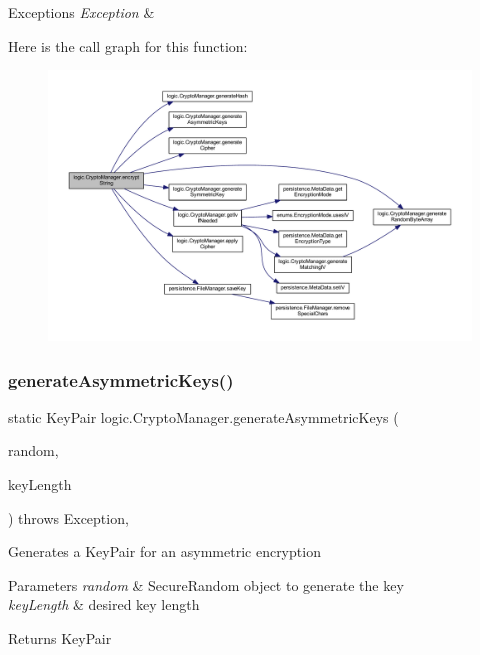 \begin{DoxyExceptions}{Exceptions}
{\em Exception} & \\
\hline
\end{DoxyExceptions}
Here is the call graph for this function\+:\nopagebreak
\begin{figure}[H]
\begin{center}
\leavevmode
\includegraphics[width=350pt]{classlogic_1_1_crypto_manager_a36145e4757e6a380388baddf5e36e984_cgraph}
\end{center}
\end{figure}
\mbox{\label{classlogic_1_1_crypto_manager_a769894ae14be3ae193f48941fa38c460}} 
\subsubsection{\texorpdfstring{generate\+Asymmetric\+Keys()}{generateAsymmetricKeys()}}
{\footnotesize\ttfamily static Key\+Pair logic.\+Crypto\+Manager.\+generate\+Asymmetric\+Keys (\begin{DoxyParamCaption}\item[{Secure\+Random}]{random,  }\item[{\mbox{\hyperlink{enumenums_1_1_key_length}{Key\+Length}}}]{key\+Length }\end{DoxyParamCaption}) throws Exception\hspace{0.3cm}{\ttfamily [static]}, {\ttfamily [private]}}

Generates a Key\+Pair for an asymmetric encryption 
\begin{DoxyParams}{Parameters}
{\em random} & Secure\+Random object to generate the key \\
\hline
{\em key\+Length} & desired key length \\
\hline
\end{DoxyParams}
\begin{DoxyReturn}{Returns}
Key\+Pair 
\end{DoxyReturn}

